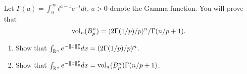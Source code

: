 

\newif\ifsolutions\solutionstrue



\ifsolutions
{}
\else
\exercisedesc{1}{02/26/19}
\fi

\begin{exercise}~\\
Let $\Gamma(a) = \int_0^\infty t^{a-1} e^{-t} dt$, $a > 0$ denote the Gamma function.
You will prove that
\[
{\rm vol}_n(B_p^n) = (2\Gamma(1/p)/p)^n/\Gamma(n/p+1).
\]
\begin{enumerate}
\item Show that $\int_{\mathbb{R}^n} e^{-\|x\|_p^p} dx = (2\Gamma(1/p)/p)^n$. \\
\item Show that $\int_{\mathbb{R}^n} e^{-\|x\|_p^p} dx = {\rm vol}_n(B_p^n) \Gamma(n/p+1)$.
\\
\end{enumerate}
\end{exercise}

